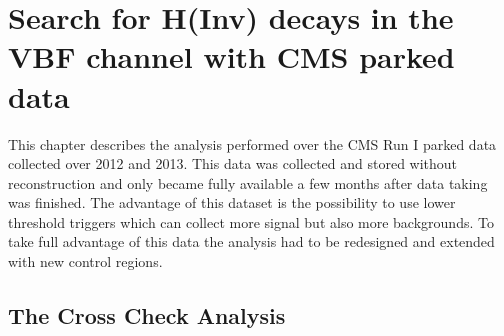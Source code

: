 \chapter{Search for H(Inv) decays in the VBF channel with CMS parked data}
\label{CHAPTER:ParkedDataAnalysis}

\glsresetall %

This chapter describes the analysis performed over the \gls{CMS} Run I parked data collected over 2012 and 2013. This data was collected and stored without reconstruction and only became fully available a few months after data taking was finished. The advantage of this dataset is the possibility to use lower threshold triggers which can collect more signal but also more backgrounds. To take full advantage of this data the analysis had to be redesigned and extended with new control regions.

% 
% 

\section{The Cross Check Analysis}
\label{CHAPTER:ParkedDataAnalysis_CrossCheckAnalysis}

